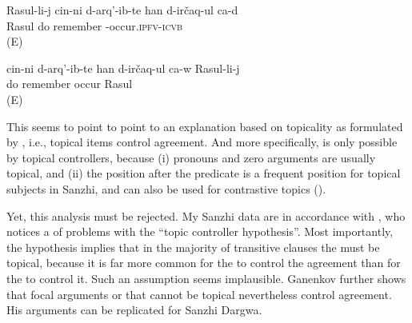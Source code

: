 \begin{exe}
	\ex	\label{ex:Rasul remembers what he had done@X}
	\begin{xlist}
		\ex	\label{ex:Rasul remembers what he had done@c}
		\gll	Rasul-li-j	cin-ni	d-arq'-ib-te	han d-irčaq-ul ca-d\\
			Rasul		do 	remember -occur.\textsc{ipfv-icvb} \\
		\glt	{} (E)

		\ex	\label{ex:Rasul remembers what he had done@d}
		\gll	cin-ni	d-arq'-ib-te	han d-irčaq-ul ca-w	Rasul-li-j\\
				do 	remember occur 	Rasul\\
		\glt	{} (E)
	\end{xlist}
\end{exe}

This seems to point to point to an explanation based on topicality as formulated by \citet{Sumbatova.Lander2014}, i.e., topical items control agreement. And more specifically,  is only possible by topical controllers, because (i) pronouns and zero arguments are usually topical, and (ii) the position after the predicate is a frequent position for topical subjects in Sanzhi, and can also be used for contrastive topics (). 

Yet, this analysis must be rejected. My Sanzhi data are in accordance with \citet{GanenkovForthcoming}, who notices a  of problems with the ``topic controller hypothesis''. Most importantly, the hypothesis implies that in the majority of transitive clauses the  must be topical, because it is far more common for the   to control the  agreement than for the   to control it. Such an assumption seems implausible. Ganenkov further shows that focal arguments or  that cannot be topical nevertheless control  agreement. His arguments can be replicated for Sanzhi Dargwa. 

